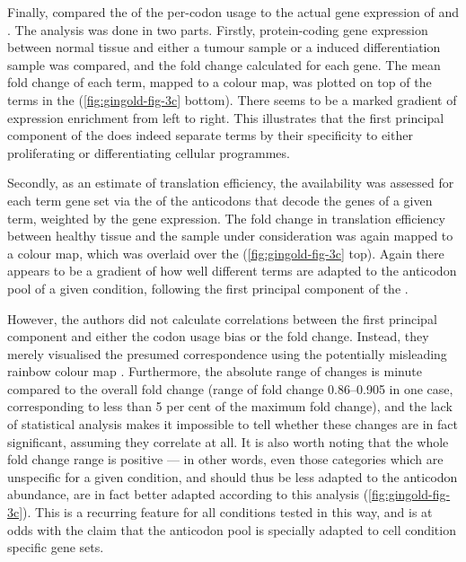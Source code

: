 Finally, \citet{Gingold:2014} compared the \pca of the per-\go codon usage to
the actual gene expression of \mrna[s] and \trna[s]. The analysis was done in
two parts. Firstly, protein-coding gene expression between normal tissue and
either a tumour sample or a induced differentiation sample was compared, and the
fold change calculated for each gene. The mean fold change of each \go term,
mapped to a colour map, was plotted on top of the \go terms in the \pca
(\cref{fig:gingold-fig-3c} bottom). There seems to be a marked gradient of \mrna
expression enrichment from left to right. This illustrates that the first
principal component of the \pca does indeed separate \go terms by their
specificity to either proliferating or differentiating cellular programmes.

Secondly, as an estimate of translation efficiency, the \trna availability was
assessed for each \go term gene set via the \tai of the \trna anticodons that
decode the genes of a given \go term, weighted by the \trna gene expression. The
fold change in translation efficiency between healthy tissue and the sample
under consideration was again mapped to a colour map, which was overlaid over
the \pca (\cref{fig:gingold-fig-3c} top). Again there appears to be a gradient
of how well different \go terms are adapted to the \trna anticodon pool of a
given condition, following the first principal component of the \pca.

However, the authors did not calculate correlations between the first principal
component and either the codon usage bias or the \tai fold change. Instead, they
merely visualised the presumed correspondence using the potentially misleading
rainbow colour map \citep{Borland:2007}. Furthermore, the absolute range of
changes is minute compared to the overall fold change (range of \tai fold change
\numrange{0.86}{0.905} in one case, corresponding to less than \num{5} per cent
of the maximum fold change), and the lack of statistical analysis makes it
impossible to tell whether these changes are in fact significant, assuming they
correlate at all. It is also worth noting that the whole fold change range is
positive --- in other words, even those \go categories which are unspecific for
a given condition, and should thus be less adapted to the \trna anticodon
abundance, are in fact better adapted according to this analysis
(\cref{fig:gingold-fig-3c}). This is a recurring feature for all conditions
tested in this way, and is at odds with the claim that the \trna anticodon pool
is specially adapted to cell condition specific gene sets.


